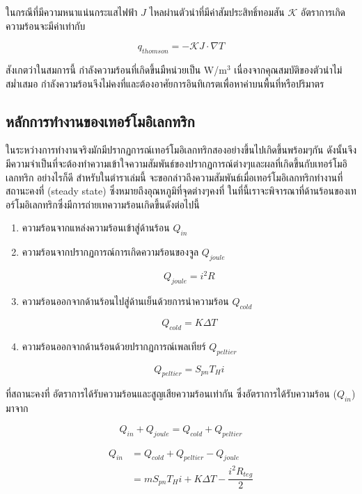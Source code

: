 \documentclass[11pt]{article}
\begin{document}
ในกรณีที่มีความหนาแน่นกระแสไฟฟ้า \(J\) ไหลผ่านตัวนำที่มีค่าสัมประสิทธิ์ทอมสัน \(\mathcal{K}\) อัตราการเกิดความร้อนจะมีค่าเท่ากับ

$$ q_{thomson} = - \mathcal{K} J \cdot \nabla T $$

สังเกตว่าในสมการนี้ กำลังความร้อนที่เกิดขึ้นมืหน่วยเป็น W/m\(^3\) เนื่องจากคุณสมบัติของตัวนำไม่สม่ำเสมอ กำลังความร้อนจึงไม่คงที่และต้องอาศัยการอินทิเกรตเพื่อหาค่าบนพื้นที่หรือปริมาตร

\subsection{หลักการทำงานของเทอร์โมอิเลกทริก}
\label{sec:orgb5d7181}

ในระหว่างการทำงานจริงมักมีปรากฏการณ์เทอร์โมอิเลกทริกสองอย่างขึ้นไปเกิดขึ้นพร้อมๆกัน ดังนั้นจึงมีความจำเป็นที่จะต้องทำความเข้าใจความสัมพันธ์ของปรากฏการณ์ต่างๆและผลที่เกิดขึ้นกับเทอร์โมอิเลกทริก อย่างไรก็ดี สำหรับในตำราเล่มนี้ จะขอกล่าวถึงความสัมพันธ์เมื่อเทอร์โมอิเลกทริกทำงานที่สถานะคงที่ (steady state) ซึ่งหมายถึงอุณหภูมิที่จุดต่างๆคงที่ ในที่นี้เราจะพิจารณาที่ด้านร้อนของเทอร์โมอิเลกทริกซึ่งมีการถ่ายเทความร้อนเกิดขึ้นดังต่อไปนี้

\begin{enumerate}
\item ความร้อนจากแหล่งความร้อนเข้าสู่ด้านร้อน $Q_{in}$
\item ความร้อนจากปรากฏการณ์การเกิดความร้อนของจูล $Q_{joule}$

  $$ Q_{joule} = i^2 R $$

\item ความร้อนออกจากด้านร้อนไปสู่ด้านเย็นด้วยการนำความร้อน $Q_{cold}$

  $$ Q_{cold} = K \Delta T $$

\item ความร้อนออกจากด้านร้อนด้วยปรากฏการณ์เพลเทียร์ $Q_{peltier}$

  $$ Q_{peltier} = S_{pn} T_H i $$
\end{enumerate}

ที่สถานะคงที่ อัตราการได้รับความร้อนและสูญเสียความร้อนเท่ากัน ซึ่งอัตราการได้รับความร้อน (\(Q_{in}\)) มาจาก

$$ Q_{in} + Q_{joule} = Q_{cold} + Q_{peltier}$$

\begin{equation}
\begin{aligned}
  Q_{in} &=  Q_{cold} + Q_{peltier} - Q_{joule}  \\
  &=  m S_{pn} T_H i +  K\Delta T -  \dfrac{i^2 R_{teg}}{2}
\end{aligned}
\end{equation}
\end{document}
